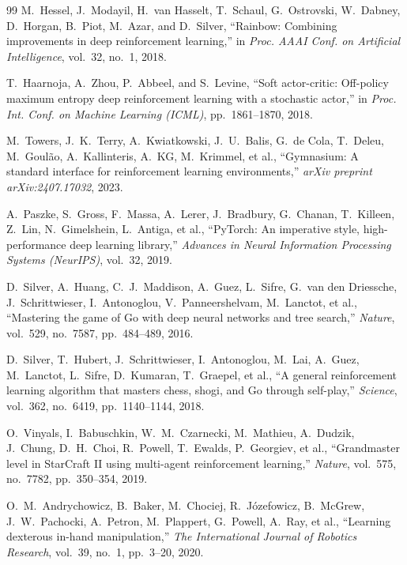 \documentclass[12pt,a4paper]{report}
\begin{document}
\begin{thebibliography}{99}
M.~Hessel, J.~Modayil, H.~van Hasselt, T.~Schaul, G.~Ostrovski, W.~Dabney, D.~Horgan, B.~Piot, M.~Azar, and D.~Silver,
``Rainbow: Combining improvements in deep reinforcement learning,''
in \textit{Proc. AAAI Conf. on Artificial Intelligence}, vol.~32, no.~1, 2018.

T.~Haarnoja, A.~Zhou, P.~Abbeel, and S.~Levine,
``Soft actor-critic: Off-policy maximum entropy deep reinforcement learning with a stochastic actor,''
in \textit{Proc. Int. Conf. on Machine Learning (ICML)}, pp.~1861--1870, 2018.

M.~Towers, J.~K.~Terry, A.~Kwiatkowski, J.~U.~Balis, G.~de Cola, T.~Deleu, M.~Goul{\~a}o, A.~Kallinteris, A.~KG, M.~Krimmel, et al.,
``Gymnasium: A standard interface for reinforcement learning environments,''
\textit{arXiv preprint arXiv:2407.17032}, 2023.

A.~Paszke, S.~Gross, F.~Massa, A.~Lerer, J.~Bradbury, G.~Chanan, T.~Killeen, Z.~Lin, N.~Gimelshein, L.~Antiga, et al.,
``PyTorch: An imperative style, high-performance deep learning library,''
\textit{Advances in Neural Information Processing Systems (NeurIPS)}, vol.~32, 2019.

D.~Silver, A.~Huang, C.~J.~Maddison, A.~Guez, L.~Sifre, G.~van den Driessche, J.~Schrittwieser, I.~Antonoglou, V.~Panneershelvam, M.~Lanctot, et al.,
``Mastering the game of Go with deep neural networks and tree search,''
\textit{Nature}, vol.~529, no.~7587, pp.~484--489, 2016.

D.~Silver, T.~Hubert, J.~Schrittwieser, I.~Antonoglou, M.~Lai, A.~Guez, M.~Lanctot, L.~Sifre, D.~Kumaran, T.~Graepel, et al.,
``A general reinforcement learning algorithm that masters chess, shogi, and Go through self-play,''
\textit{Science}, vol.~362, no.~6419, pp.~1140--1144, 2018.

O.~Vinyals, I.~Babuschkin, W.~M.~Czarnecki, M.~Mathieu, A.~Dudzik, J.~Chung, D.~H.~Choi, R.~Powell, T.~Ewalds, P.~Georgiev, et al.,
``Grandmaster level in StarCraft II using multi-agent reinforcement learning,''
\textit{Nature}, vol.~575, no.~7782, pp.~350--354, 2019.

O.~M.~Andrychowicz, B.~Baker, M.~Chociej, R.~J{\'o}zefowicz, B.~McGrew, J.~W.~Pachocki, A.~Petron, M.~Plappert, G.~Powell, A.~Ray, et al.,
``Learning dexterous in-hand manipulation,''
\textit{The International Journal of Robotics Research}, vol.~39, no.~1, pp.~3--20, 2020.


\end{thebibliography}
\end{document}
